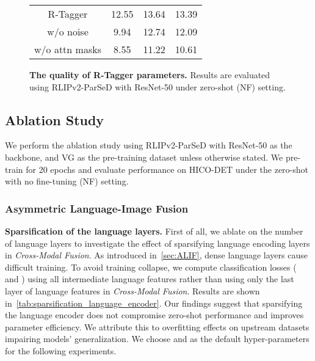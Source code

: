 \begin{figure*}[t]
{\begin{minipage}[r]{0.35\textwidth}
\begin{tabular}{c|ccc}
    \midrule
    R-Tagger & 12.55 & 13.64 & 13.39 \\
w/o noise & 9.94  & 12.74 & 12.09 \\
    w/o attn masks & 8.55  & 11.22 & 10.61 \\
    \bottomrule
    \end{tabular}
    \vspace{-.1cm}
    \makeatletter{}\makeatother\caption{\small \textbf{The quality of R-Tagger parameters.} Results are evaluated using RLIPv2-ParSeD with ResNet-50 under zero-shot (NF) setting. }
    \vspace{-.2cm}
  \label{tab:R-Tagger_params}
\end{minipage}}
\end{figure*}



\subsection{Ablation Study}
We perform the ablation study using RLIPv2-ParSeD with ResNet-50 as the backbone, and VG as the pre-training dataset unless otherwise stated.
We pre-train for 20 epochs and evaluate performance on HICO-DET under the zero-shot with no fine-tuning (NF) setting.

\vspace{-.2cm}
\subsubsection{Asymmetric Language-Image Fusion}
\textbf{Sparsification of the language layers.} 
First of all, we ablate on the number of language layers to investigate the effect of sparsifying language encoding layers in \textit{Cross-Modal Fusion}.
As introduced in~\cref{sec:ALIF}, dense language layers cause difficult training.
To avoid training collapse, we compute classification losses ( and ) using all intermediate language features rather than using only the last layer of language features in \textit{Cross-Modal Fusion}.
Results are shown in~\cref{tab:sparsification_language_encoder}.
Our findings suggest that sparsifying the language encoder does not compromise zero-shot performance and improves parameter efficiency.
We attribute this to overfitting effects on upstream datasets impairing models' generalization.
We choose  and  as the default hyper-parameters for the following experiments.









